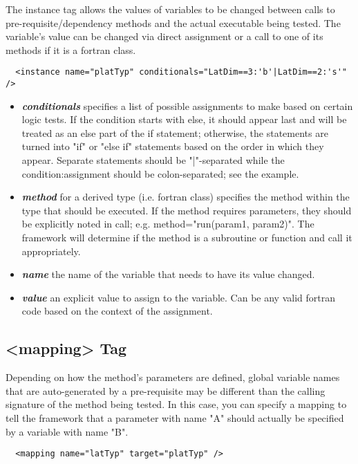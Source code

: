 \documentclass[paper=a4, fontsize=11pt]{scrartcl} %
\numberwithin{equation}{section} %
\numberwithin{figure}{section} %
\numberwithin{table}{section} %
\begin{document}
The instance tag allows the values of variables to be changed between calls to pre-requisite/dependency
methods and the actual executable being tested. The variable's value can be changed via direct assignment
or a call to one of its methods if it is a fortran class.

\begin{lstlisting}
  <instance name="platTyp" conditionals="LatDim==3:'b'|LatDim==2:'s'" />
\end{lstlisting}

\begin{itemize}
\item \textbf{\textit{conditionals}} specifies a list of possible assignments to make based on certain
logic tests. If the condition starts with else, it should appear last and will be treated as an else
part of the if statement; otherwise, the statements are turned into "if" or "else if" statements based
on the order in which they appear. Separate statements should be "|"-separated while the
condition:assignment should be colon-separated; see the example.
\item \textbf{\textit{method}} for a derived type (i.e. fortran class) specifies the method within the
type that should be executed. If the method requires parameters, they should be explicitly noted in
call; e.g. method="run(param1, param2)". The framework will determine if the method is a subroutine
or function and call it appropriately.
\item \textbf{\textit{name}} the name of the variable that needs to have its value changed.
\item \textbf{\textit{value}} an explicit value to assign to the variable. Can be any valid fortran
code based on the context of the assignment.
\end{itemize}

\subsection{<mapping> Tag}

Depending on how the method's parameters are defined, global variable names that are auto-generated
by a pre-requisite may be different than the calling signature of the method being tested. In this
case, you can specify a mapping to tell the framework that a parameter with name "A" should actually
be specified by a variable with name "B".

\begin{lstlisting}
  <mapping name="latTyp" target="platTyp" />
\end{lstlisting}
\end{document}
